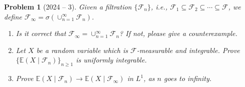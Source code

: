 \documentclass[12pt]{amsart}
\newtheorem{problem}{Problem}
\begin{document}
\begin{problem}[2024 -- 3]
Given a filtration $\{\mathcal{F}_n\}$, i.e., $\mathcal{F}_1 \subseteq \mathcal{F}_2 \subseteq \cdots \subseteq \mathcal{F}$, we define $\mathcal{F}_{\infty}= \sigma(\cup_{n=1}^{\infty} \mathcal{F}_n)$.
\begin{enumerate}[label=(\alph*)]
\item Is it correct that $\mathcal{F}_{\infty}=\cup_{n=1}^{\infty} \mathcal{F}_n$? If not, please give a counterexample.
\item Let $X$ be a random variable which is $\mathcal{F}$-measurable and integrable. Prove $\{\mathbb{E}(X \mid \mathcal{F}_n)\}_{n \geq 1}$ is uniformly integrable.
\item Prove $\mathbb{E}(X \mid \mathcal{F}_n) \rightarrow \mathbb{E}(X \mid \mathcal{F}_{\infty})$ in $L^1$, as $n$ goes to infinity.
\end{enumerate}
\end{problem}
\end{document}
